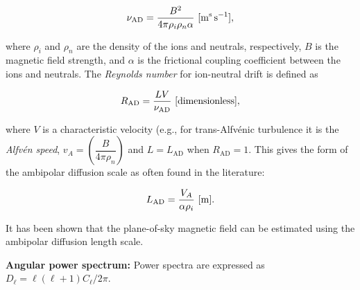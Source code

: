 \documentclass[a4paper,10pt]{article}
\begin{document}
\begin{align*}
    \nu_\mathrm{AD} = \frac{B^2}{4\pi\rho_i\rho_n\alpha} ~ [{\rm m^s\,s^{-1}}],
\end{align*}

{\noindent}where $\rho_i$ and $\rho_n$ are the density of the ions and neutrals, respectively, $B$ is the magnetic field strength, and $\alpha$ is the frictional coupling coefficient between the ions and neutrals. The \textit{Reynolds number} for ion-neutral drift is defined as

\begin{align*}
    R_\mathrm{AD} = \frac{LV}{\nu_\mathrm{AD}} ~ [{\rm dimensionless}],
\end{align*}

{\noindent}where $V$ is a characteristic velocity (e.g., for trans-Alfv\'enic turbulence it is the \textit{Alfv\'en speed}, $v_A = \left(\dfrac{B}{4\pi\rho_n}\right)$ and $L=L_\mathrm{AD}$ when $R_\mathrm{AD}=1$. This gives the form of the ambipolar diffusion scale as often found in the literature:

\begin{align*}
    L_\mathrm{AD} = \frac{V_A}{\alpha\rho_i} ~ [{\rm m}].
\end{align*}

{\noindent}It has been shown that the plane-of-sky magnetic field can be estimated using the ambipolar diffusion length scale. 

{\noindent}\textbf{Angular power spectrum:} Power spectra are expressed as $D_\ell = \ell(\ell+1)C_\ell/2\pi$.
\end{document}
